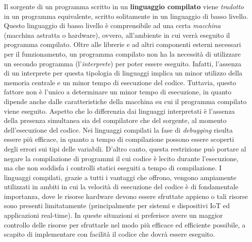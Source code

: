 Il sorgente di un programma scritto in un \textbf{linguaggio compilato} viene \textit{tradotto} in un programma equivalente, scritto solitamente in un linguaggio di basso livello. Questo linguaggio di basso livello è comprensibile ad una certa \textit{macchina} (macchina astratta o hardware), ovvero, all'ambiente in cui verrà eseguito il programma compilato. Oltre alle librerie e ad altri componenti esterni necessari per il funzionamento, un programma compilato non ha la necessità di utilizzare un secondo programma (l'\textit{interprete}) per poter essere eseguito. Infatti, l'assenza di un interprete per questa tipologia di linguaggi implica un minor utilizzo della memoria centrale e un minor tempo di esecuzione del codice. Tuttavia, questo fattore non è l'unico a determinare un minor tempo di esecuzione, in quanto dipende anche dalle caratteristiche della macchina su cui il programma compilato viene eseguito. Aspetto che lo differenzia dai linguaggi interpretati è l'assenza della presenza simultanea sia del compilatore che del sorgente, al momento dell'esecuzione del codice. Nei linguaggi compilati la fase di \textit{debugging} risulta essere più efficace, in quanto a tempo di compilazione possono essere scoperti degli errori sui tipi delle variabili. D'altro canto, questa restrizione può portare al negare la compilazione di programmi il cui codice è lecito durante l'esecuzione, ma che non soddisfa i controlli statici eseguiti a tempo di compilazione. I linguaggi compilati, grazie a tutti i vantaggi che offrono, vengono ampiamente utilizzati in ambiti in cui la velocità di esecuzione del codice è di fondamentale importanza, dove le risorse hardware devono essere sfruttate appieno o tali risorse sono presenti limitatamente (principalmente per sistemi e dispositivi IoT ed applicazioni real-time). In queste situazioni si preferisce avere un maggior controllo delle risorse per sfruttarle nel modo più efficace ed   efficiente possibile, a scapito di implementare con facilità il codice che dovrà essere eseguito.

